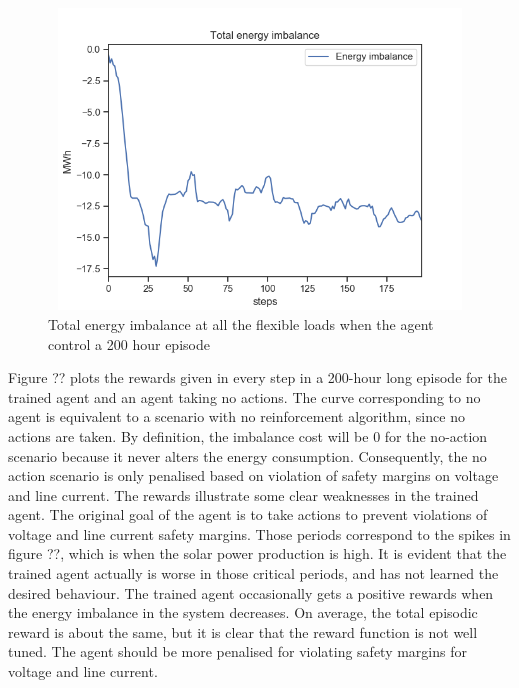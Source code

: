 \documentclass[class=book, crop=false]{standalone}
\begin{document}
\begin{figure}[H]
    \center
\includegraphics[height=8cm, width=12cm]{figures/configuration1_imbalance.png}
    \caption[size = 9]{Total energy imbalance at all the flexible loads when the agent control a 200 hour episode}
    \label{fig:results:configuration1_energy_imbalance}
\end{figure}
Figure ?? plots the rewards given in every step in a 200-hour long episode for the trained agent and an agent taking no actions. The curve corresponding to no agent is equivalent to a scenario with no reinforcement algorithm, since no actions are taken. By definition, the imbalance cost will be 0 for the no-action scenario because it never alters the energy consumption. Consequently, the no action scenario is only penalised based on violation of safety margins on voltage and line current. The rewards illustrate some clear weaknesses in the trained agent. The original goal of the agent is to take actions to prevent violations of voltage and line current safety margins. Those periods correspond to the spikes in figure ??, which is when the solar power production is high. It is evident that the trained agent actually is worse in those critical periods, and has not learned the desired behaviour. The trained agent occasionally gets a positive rewards when the energy imbalance in the system decreases. On average, the total episodic reward is about the same, but it is clear that the reward function is not well tuned. The agent should be more penalised for violating safety margins for voltage and line current.
\end{document}
